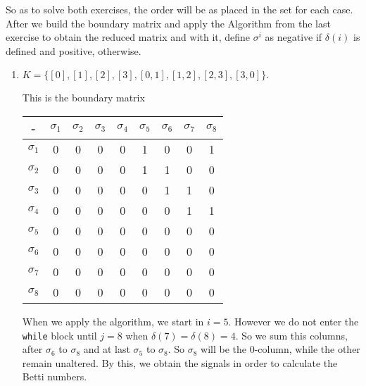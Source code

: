 So as to solve both exercises, the order will be as placed in the set for each
case.
After we build the boundary matrix and apply the Algorithm from the last
exercise to obtain the reduced matrix and with it, define $\sigma^i$ as negative
if $\delta(i)$ is defined and positive, otherwise. 

\begin{enumerate}
    \item    $K = \{[0], [1], [2], [3], [0, 1], [1, 2], [2, 3], [3, 0]\}.$
    
    This is the boundary matrix

    \begin{center}
        \begin{tabular}{|c|c|c|c|c|c|c|c|c|}
        \hline
        -          & $\sigma_1$ & $\sigma_2$ & $\sigma_3$ & $\sigma_4$ & $\sigma_5$ & $\sigma_6$ & $\sigma_7$ & $\sigma_8$ \\ \hline
        $\sigma_1$ & 0          & 0          & 0          & 0          & 1          & 0          & 0          & 1          \\ \hline
        $\sigma_2$ & 0          & 0          & 0          & 0          & 1          & 1          & 0          & 0          \\ \hline
        $\sigma_3$ & 0          & 0          & 0          & 0          & 0          & 1          & 1          & 0          \\ \hline
        $\sigma_4$ & 0          & 0          & 0          & 0          & 0          & 0          & 1          & 1          \\ \hline
        $\sigma_5$ & 0          & 0          & 0          & 0          & 0          & 0          & 0          & 0          \\ \hline
        $\sigma_6$ & 0          & 0          & 0          & 0          & 0          & 0          & 0          & 0          \\ \hline
        $\sigma_7$ & 0          & 0          & 0          & 0          & 0          & 0          & 0          & 0          \\ \hline
        $\sigma_8$ & 0          & 0          & 0          & 0          & 0          & 0          & 0          & 0          \\ \hline
        \end{tabular}
    \end{center}

    When we apply the algorithm, we start in $i = 5$. However we do not enter
    the \texttt{while} block until $j = 8$ when $\delta(7) =
    \delta(8) = 4$. So we sum this columns, after $\sigma_6$ to $\sigma_8$ and
    at last $\sigma_5$ to $\sigma_8$. So $\sigma_8$ will be the 0-column,
    while the other remain unaltered. By this, we obtain the signals in order
    to calculate the Betti numbers. 


\end{enumerate}
